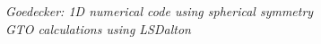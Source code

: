 \begin{frame}
\vspace{1mm}

\it{Goedecker: 1D numerical code using spherical symmetry}\\
\it{GTO calculations using LSDalton}

\vspace{5mm}

%

\end{frame}

